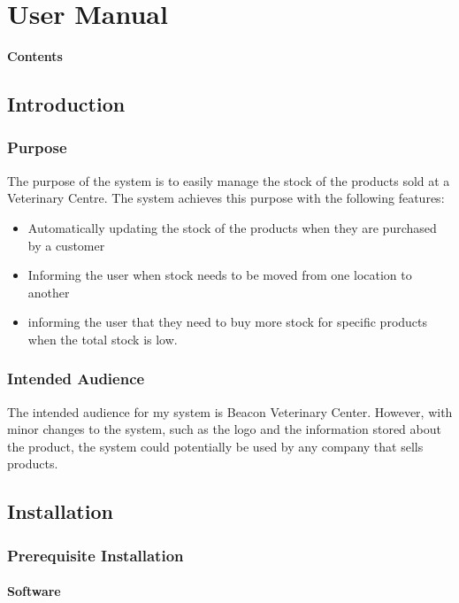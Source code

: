 
\chapter{User Manual}

{\LARGE{\textbf{Contents}}}

\startcontents[chapters]

\section{Introduction}

\subsection{Purpose}

The purpose of the system is to easily manage the stock of the products sold at a Veterinary Centre. The system achieves this purpose with the following features:

\begin{itemize}
\item{Automatically updating the stock of the products when they are purchased by a customer}
\item{Informing the user when stock needs to be moved from one location to another}
\item{informing the user that they need to buy more stock for specific products when the total stock is low.}
\end{itemize}

\subsection{Intended Audience}

The intended audience for my system is Beacon Veterinary Center. However, with minor changes to the system, such as the logo and the information stored about the product, the system could potentially be used by any company that sells products. 

\pagebreak

\section{Installation}

\subsection{Prerequisite Installation}
\subsubsection{Software}

